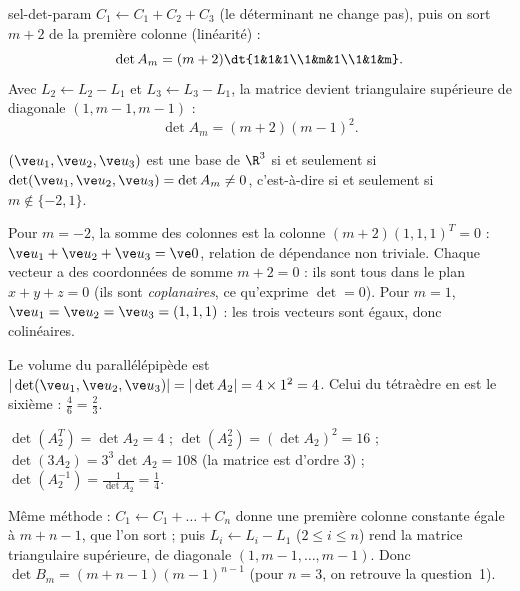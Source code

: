 \begin{corrige}{sel-det-param}
 $C_1\leftarrow C_1+C_2+C_3$ (le déterminant ne change pas), puis on sort $m+2$ de la première colonne (linéarité) :
\[\det A_m=(m+2)\dt{1&1&1\\1&m&1\\1&1&m}.\]
Avec $L_2\leftarrow L_2-L_1$ et $L_3\leftarrow L_3-L_1$, la matrice devient triangulaire supérieure de diagonale $(1,m-1,m-1)$ :
\[\det A_m=(m+2)(m-1)^2.\]

 $(\ve u_1,\ve u_2,\ve u_3)$ est une base de $\R^3$ si et seulement si $\det(\ve u_1,\ve u_2,\ve u_3)=\det A_m\neq0$, c'est-à-dire si et seulement si $m\notin\{-2,1\}$.

 Pour $m=-2$, la somme des colonnes est la colonne $(m+2)(1,1,1)^T=0$ : $\ve u_1+\ve u_2+\ve u_3=\ve 0$, relation de dépendance non triviale. Chaque vecteur a des coordonnées de somme $m+2=0$ : ils sont tous dans le plan $x+y+z=0$ (ils sont \emph{coplanaires}, ce qu'exprime $\det=0$).
Pour $m=1$, $\ve u_1=\ve u_2=\ve u_3=(1,1,1)$ : les trois vecteurs sont égaux, donc colinéaires.

 Le volume du parallélépipède est $|\det(\ve u_1,\ve u_2,\ve u_3)|=|\det A_2|=4\times1^2=4$. Celui du tétraèdre en est le sixième : $\frac46=\frac23$.

 $\det(A_2^T)=\det A_2=4$ ; $\det(A_2^2)=(\det A_2)^2=16$ ; $\det(3A_2)=3^3\det A_2=108$ (la matrice est d'ordre $3$) ; $\det(A_2^{-1})=\frac1{\det A_2}=\frac14$.

 Même méthode : $C_1\leftarrow C_1+\dots+C_n$ donne une première colonne constante égale à $m+n-1$, que l'on sort ; puis $L_i\leftarrow L_i-L_1$ ($2\leq i\leq n$) rend la matrice triangulaire supérieure, de diagonale $(1,m-1,\dots,m-1)$. Donc $\det B_m=(m+n-1)(m-1)^{n-1}$ (pour $n=3$, on retrouve la question~1).
\end{corrige}

